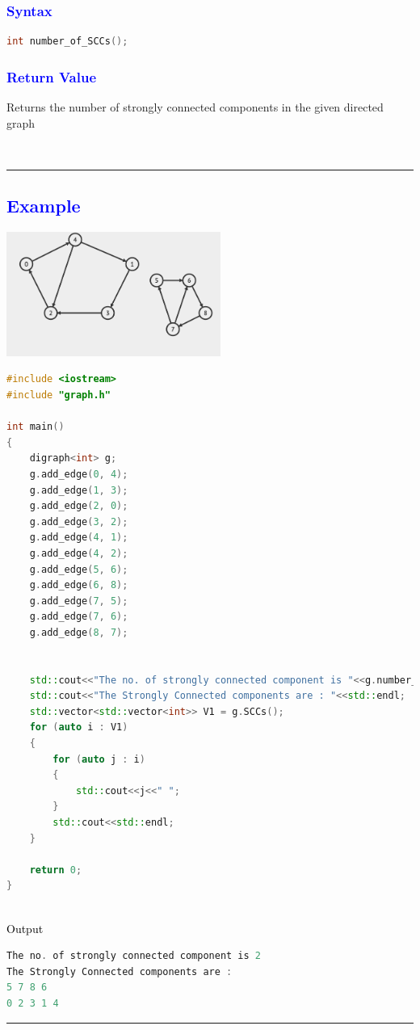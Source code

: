 \documentclass[11pt,a4paper]{article}
\begin{document}
\subsubsection*{\textcolor{blue}{ \large {Syntax}}}
\begin{lstlisting}[language=C++]
int number_of_SCCs();


\end{lstlisting}
\subsubsection*{\textcolor{blue}{ \large {Return Value}}}
Returns the number of strongly connected components in the given directed graph


\
\\
\rule{17cm}{0.1mm}


\subsection*{\textcolor{blue}{\Large Example }}
\includegraphics[width=70mm]{example5.png}
\begin{lstlisting}[language=C++]
#include <iostream>
#include "graph.h"

int main()
{
    digraph<int> g;
    g.add_edge(0, 4);
    g.add_edge(1, 3);
    g.add_edge(2, 0);
    g.add_edge(3, 2);
    g.add_edge(4, 1);
    g.add_edge(4, 2);
    g.add_edge(5, 6);
    g.add_edge(6, 8);
    g.add_edge(7, 5); 
    g.add_edge(7, 6); 
    g.add_edge(8, 7); 

    
    std::cout<<"The no. of strongly connected component is "<<g.number_of_SCCs()<<std::endl;
    std::cout<<"The Strongly Connected components are : "<<std::endl;
    std::vector<std::vector<int>> V1 = g.SCCs();
    for (auto i : V1)
    {
        for (auto j : i)
        {
            std::cout<<j<<" ";
        }
        std::cout<<std::endl;
    }

    return 0;
}

\end{lstlisting}
\\
{\textcolor{black}{\normalsize Output }}
\begin{lstlisting}[language=C++]
The no. of strongly connected component is 2
The Strongly Connected components are :
5 7 8 6
0 2 3 1 4
\end{lstlisting}
\rule{17cm}{0.1mm}
\end{document}
